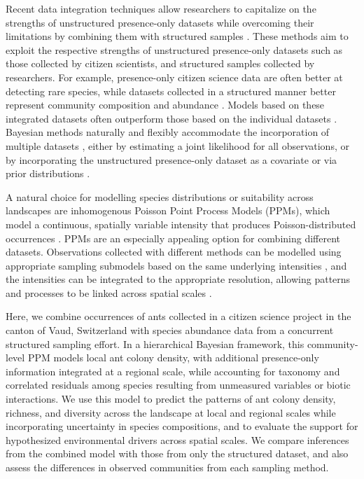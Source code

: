 \documentclass[preprint,review,times,12pt,3p]{elsarticle}
\begin{document}
Recent data integration techniques allow researchers to capitalize on the strengths of unstructured presence-only datasets while overcoming their limitations by combining them with structured samples \citep{Isaac2019,Miller2019}. These methods aim to exploit the respective strengths of unstructured presence-only datasets such as those collected by citizen scientists, and structured samples collected by researchers. For example, presence-only citizen science data are often better at detecting rare species, while datasets collected in a structured manner better represent community composition and abundance \citep{Steen2019,Henckel2020,Pernat2020}. Models based on these integrated datasets often outperform those based on the individual datasets \citep{Dorazio2014b,Fithian2015,Koshkina2017a}. Bayesian methods naturally and flexibly accommodate the incorporation of multiple datasets \citep{Clark2005,BeckEtAl2012,Szewczyk2018}, either by estimating a joint likelihood for all observations, or by incorporating the unstructured presence-only dataset as a covariate or via prior distributions \citep{Fletcher2019,Isaac2019,Miller2019}. 

A natural choice for modelling species distributions or suitability across landscapes are inhomogenous Poisson Point Process Models (PPMs), which model a continuous, spatially variable intensity that produces Poisson-distributed occurrences \citep{Renner2013a,Renner2015}. PPMs are an especially appealing option for combining different datasets. Observations collected with different methods can be modelled using appropriate sampling submodels based on the same underlying intensities \citep{Fithian2015,Hefley2016,Koshkina2017a,Fletcher2019,Renner2019}, and the intensities can be integrated to the appropriate resolution, allowing patterns and processes to be linked across spatial scales \citep{Keil2014,Hefley2016}.

Here, we combine occurrences of ants collected in a citizen science project in the canton of Vaud, Switzerland with species abundance data from a concurrent structured sampling effort. In a hierarchical Bayesian framework, this community-level PPM models local ant colony density, with additional presence-only information integrated at a regional scale, while accounting for taxonomy and correlated residuals among species resulting from unmeasured variables or biotic interactions. We use this model to predict the patterns of ant colony density, richness, and diversity across the landscape at local and regional scales while incorporating uncertainty in species compositions, and to evaluate the support for hypothesized environmental drivers across spatial scales. We compare inferences from the combined model with those from only the structured dataset, and also assess the differences in observed communities from each sampling method. 
\end{document}
